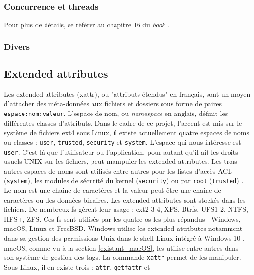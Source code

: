 \documentclass[a4paper, 12pt]{article}
\begin{document}
\subsubsection{Concurrence et threads}
Pour plus de détails, se référer au chapitre 16 du \textit{book} \cite{ref0}.

\subsubsection{Divers}


\subsection{Extended attributes}\label{extended_attributes}
Les extended attributes (\acrshort{xattr}), ou "attributs étendus" en français, sont un moyen d'attacher des 
méta-données aux fichiers et dossiers sous forme de paires \texttt{espace:nom:valeur}. 
L'espace de nom, ou \textit{namespace} en anglais, définit les différentes classes d'attributs. 
Dans le cadre de ce projet, l'accent est mis sur le système de fichiers ext4 \cite{ref36}
sous Linux, il existe actuellement quatre espaces de noms 
ou classes : \texttt{user}, \texttt{trusted}, \texttt{security} et 
\texttt{system}. L'espace qui nous intéresse est \texttt{user}. C'est là que 
l'utilisateur ou l'application, pour autant qu'il ait les droits usuels UNIX sur les fichiers, peut 
manipuler les extended attributes. Les trois autres espaces de noms sont utilisés entre autres pour 
les listes d'accès ACL (\texttt{system}), les modules de sécurité du kernel 
(\texttt{security}) ou par \texttt{root} (\texttt{trusted})
\cite{ref11} \cite{ref12}.
Le nom est une chaine de caractères et la valeur peut être une chaine de caractères ou des données binaires. 
Les extended attributes sont stockés dans les fichiers. De nombreux \acrshort{fs} gèrent leur 
usage : ext2-3-4, XFS, Btrfs, UFS1-2, NTFS, HFS+, ZFS. Ces \acrshort{fs} sont utilisés par 
les quatre \acrshort{os} les plus répandus : Windows, macOS, Linux et FreeBSD. Windows utilise 
les extended attributes notamment dans sa gestion des permissions Unix dans le shell Linux intégré 
à Windows 10 \cite{ref21}. macOS, comme vu à la section \ref{existant_macOS}, les utilise entre 
autres dans son système de gestion des tags. La commande \texttt{xattr} permet de les 
manipuler. Sous Linux, il en existe trois : \texttt{attr}, \texttt{getfattr} et 
\end{document}
